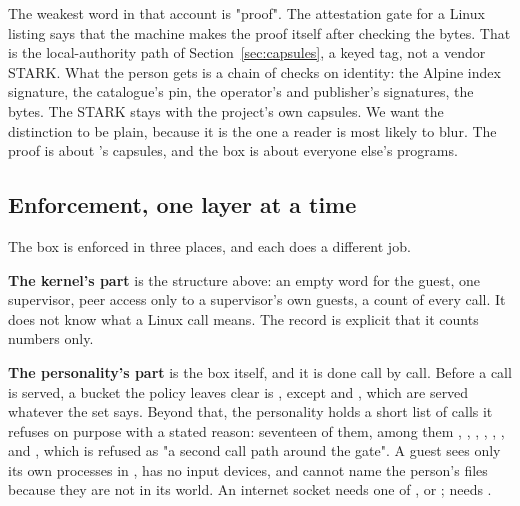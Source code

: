 The weakest word in that account is "proof". The attestation gate for a Linux listing says that the machine makes the proof itself after checking the bytes. That is the local-authority path of Section~\ref{sec:capsules}, a keyed tag, not a vendor STARK. What the person gets is a chain of checks on identity: the Alpine index signature, the catalogue's pin, the operator's and publisher's signatures, the bytes. The STARK stays with the project's own capsules. We want the distinction to be plain, because it is the one a reader is most likely to blur. The proof is about \nonos{}'s capsules, and the box is about everyone else's programs.

\subsection{Enforcement, one layer at a time}

The box is enforced in three places, and each does a different job.

\textbf{The kernel's part} is the structure above: an empty word for the guest, one supervisor, peer access only to a supervisor's own guests, a count of every call. It does not know what a Linux call means. The record is explicit that it counts numbers only.

\textbf{The personality's part} is the box itself, and it is done call by call. Before a call is served, a bucket the policy leaves clear is , except  and , which are served whatever the set says. Beyond that, the personality holds a short list of calls it refuses on purpose with a stated reason: seventeen of them, among them , , , , , ,  and , which is refused as "a second call path around the gate". A guest sees only its own processes in , has no input devices, and cannot name the person's files because they are not in its world. An internet socket needs one of ,  or ;  needs .

